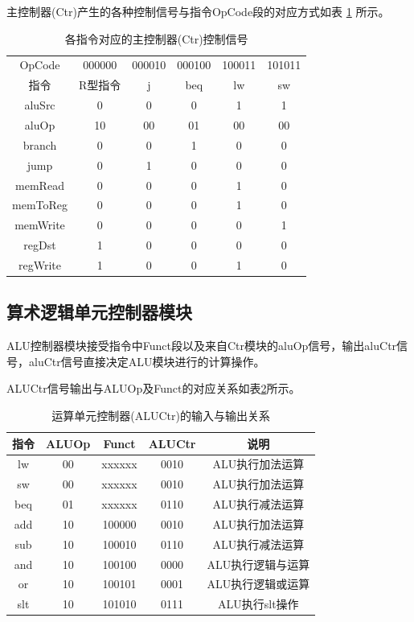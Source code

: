 \documentclass[UTF8]{ctexart}
\begin{document}
主控制器(Ctr)产生的各种控制信号与指令OpCode段的对应方式如表 \ref{tab-ctr-sig-set} 所示。
\begin{table}[htbp]
    \centering
    \begin{tabular}{|c|c|c|c|c|c|}
        \hline
        OpCode   & 000000 & 000010 & 000100 & 100011 & 101011 \\
        指令       & R型指令   & j      & beq    & lw     & sw     \\ 
        \hline
        aluSrc   & 0      & 0      & 0      & 1      & 1      \\
        aluOp    & 10     & 00     & 01     & 00     & 00     \\
        branch   & 0      & 0      & 1      & 0      & 0      \\
        jump     & 0      & 1      & 0      & 0      & 0      \\
        memRead  & 0      & 0      & 0      & 1      & 0      \\
        memToReg & 0      & 0      & 0      & 1      & 0      \\
        memWrite & 0      & 0      & 0      & 0      & 1      \\
        regDst   & 1      & 0      & 0      & 0      & 0      \\
        regWrite & 1      & 0      & 0      & 1      & 0      \\ 
        \hline
    \end{tabular}
    \caption{各指令对应的主控制器(Ctr)控制信号}
    \label{tab-ctr-sig-set}
\end{table}
\subsection{算术逻辑单元控制器模块}
    ALU控制器模块接受指令中Funct段以及来自Ctr模块的aluOp信号，输出aluCtr信号，aluCtr信号直接决定ALU模块进行的计算操作。\par
    ALUCtr信号输出与ALUOp及Funct的对应关系如表\ref{tab:aluctr-in-out}所示。
    \begin{table}[htbp]
        \centering
        \begin{tabular}{|c|c|c|c|c|}
            \hline
            指令 & ALUOp & Funct & ALUCtr & 说明\\ 
            \hline
            lw & 00 & xxxxxx & 0010 & ALU执行加法运算 \\
            sw & 00 & xxxxxx & 0010 & ALU执行加法运算 \\
            beq & 01 & xxxxxx & 0110 & ALU执行减法运算 \\
            add & 10 & 100000 & 0010 & ALU执行加法运算\\
            sub & 10 & 100010 & 0110 & ALU执行减法运算\\
            and & 10 & 100100 & 0000 & ALU执行逻辑与运算\\
            or & 10 & 100101 & 0001 & ALU执行逻辑或运算\\
            slt & 10 & 101010 & 0111 & ALU执行slt操作\\
            \hline
        \end{tabular}
        \caption{运算单元控制器(ALUCtr)的输入与输出关系}
        \label{tab:aluctr-in-out}
    \end{table}
\end{document}
